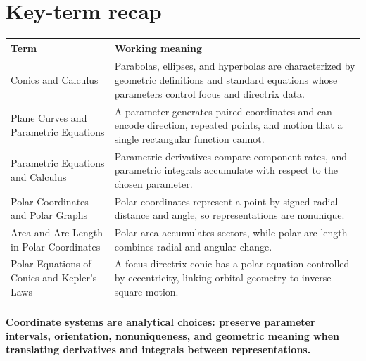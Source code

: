 \documentclass[11pt]{article}
\begin{document}
\normalsize

\section{Key-term recap}
\small
\begin{longtable}{@{}>{\RaggedRight\arraybackslash}p{}>{\RaggedRight\arraybackslash}p{}@{}}
\toprule
\textbf{Term} & \textbf{Working meaning}\\
\midrule\endhead
Conics and Calculus & Parabolas, ellipses, and hyperbolas are characterized by geometric definitions and standard equations whose parameters control focus and directrix data. \\\addlinespace[2pt]
Plane Curves and Parametric Equations & A parameter generates paired coordinates and can encode direction, repeated points, and motion that a single rectangular function cannot. \\\addlinespace[2pt]
Parametric Equations and Calculus & Parametric derivatives compare component rates, and parametric integrals accumulate with respect to the chosen parameter. \\\addlinespace[2pt]
Polar Coordinates and Polar Graphs & Polar coordinates represent a point by signed radial distance and angle, so representations are nonunique. \\\addlinespace[2pt]
Area and Arc Length in Polar Coordinates & Polar area accumulates sectors, while polar arc length combines radial and angular change. \\\addlinespace[2pt]
Polar Equations of Conics and Kepler's Laws & A focus-directrix conic has a polar equation controlled by eccentricity, linking orbital geometry to inverse-square motion. \\\addlinespace[2pt]
\bottomrule
\end{longtable}
\normalsize

\enlargethispage{4\baselineskip}
\begin{tcolorbox}[title=One-sentence takeaway,fonttitle=\bfseries,colback=Ink,colframe=Ink,coltext=white,coltitle=white,arc=2mm,boxrule=0pt]
\centering\bfseries Coordinate systems are analytical choices: preserve parameter intervals, orientation, nonuniqueness, and geometric meaning when translating derivatives and integrals between representations.
\end{tcolorbox}
\end{document}
